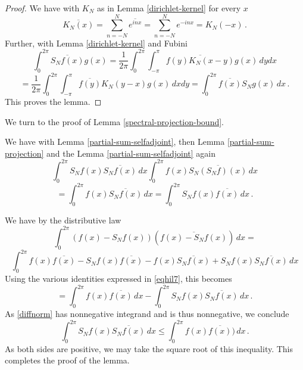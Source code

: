 {\begin{proof}
  We have with $K_N$ as in Lemma \ref{dirichlet-kernel} for every $x$
  \begin{equation}
      \overline{K_N(x)}=\sum_{n=-N}^N\overline{ e^{in x}}=
      {\sum_{n=-N}^N e^{-in x}}=K_N(-x)\, .
  \end{equation}
 Further, with Lemma \ref{dirichlet-kernel} and Fubini
\begin{equation*}
\int_0^{2\pi} \overline{S_Nf(x)} g(x)
= \frac 1{2\pi} \int_0^{2\pi} \int_{-\pi}^{\pi}\overline{f(y) K_N(x-y)} g(x)\, dy dx
 \end{equation*}
 \begin{equation}
=
\frac 1{2\pi} \int_0^{2\pi} \int_{-\pi}^{\pi}\overline{f(y)} K_N(y-x)
g(x)\, dx dy
=\int_0^{2\pi} \overline{f(x)} S_Ng(x)\, dx
\, .
\end{equation}
 This proves the lemma.
\end{proof}


We turn to the proof of Lemma
\ref{spectral-projection-bound}.

We have with Lemma \ref{partial-sum-selfadjoint}, then Lemma \ref{partial-sum-projection} and the Lemma \ref{partial-sum-selfadjoint} again
\begin{equation*}
 \int_0^{2\pi}  S_Nf(x)\overline{S_Nf(x)}\, dx
 \int_0^{2\pi}  f(x)\overline{S_N(S_Nf)(x)}\, dx
\end{equation*}
\begin{equation}\label{eqhil7}
 =\int_0^{2\pi}  f(x)\overline{S_Nf(x)}\, dx=
 \int_0^{2\pi}  S_N f(x)\overline{f(x)}\, dx\, .
\end{equation}

We have by the distributive law
\begin{equation}\label{diffnorm}
    \int_0^{2\pi} (f(x)-S_Nf(x))(\overline{f(x)-S_Nf(x)})\, dx=
\end{equation}
\begin{equation*}
 \int_0^{2\pi} f(x)\overline{f(x)}
    -S_Nf(x)\overline{f(x)}
   -f(x)\overline{S_Nf(x)}
     + S_Nf(x)\overline{S_Nf(x)}\, dx
\end{equation*}
Using the various identities expressed in \eqref{eqhil7}, this becomes
\begin{equation}
 =\int_0^{2\pi} f(x)\overline{f(x)}\, dx
    -
   \int_0^{2\pi} S_Nf(x)\overline{S_Nf(x)}\, dx\, .
\end{equation}
As \eqref{diffnorm} has nonnegative integrand and is thus nonnegative, we conclude
\begin{equation}
  \int_0^{2\pi} S_Nf(x)\overline{S_Nf(x)}\, dx\le
 \int_0^{2\pi} f(x)\overline{f(x)})\, dx\, .
\end{equation}
As both sides are positive, we may take the square root of this inequality.
This completes the proof of the lemma.





}
